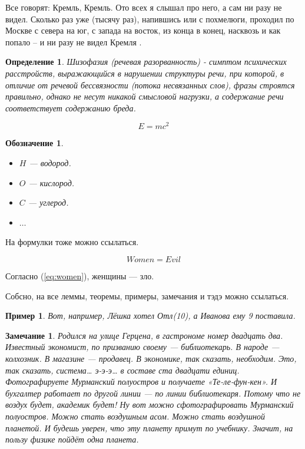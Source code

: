 \documentclass[14pt, a4paper, russian]{report}
\newtheorem{remark}{\indent Замечание}
\newtheorem{definition}{\indent Определение}
\newtheorem{example}{\indent Пример}
\newtheorem{notation}{\indent Обозначение}
\begin{document}
\begin{normalsize}
Все говорят: Кремль, Кремль. Ото всех я слышал про него, а сам ни разу не видел. Сколько раз уже (тысячу раз), напившись или с похмелюги, проходил по Москве с севера на юг, с запада на восток, из конца в конец, насквозь и как попало – и ни разу не видел Кремля \cite{erofeev}.

\begin{definition}\label{def:schizo}
Шизофазия (речевая разорванность) - симптом психических расстройств, выражающийся в нарушении структуры речи, при которой, в отличие от речевой бессвязности (потока несвязанных слов), фразы строятся правильно, однако не несут никакой смысловой нагрузки, а содержание речи соответствует содержанию бреда.\cite{schizo}
\end{definition}
$$E = m c^2$$

\begin{notation} 
\begin{itemize}
\item $H$ --- водород.
\item $O$ --- кислород.
\item $C$ --- углерод.
\item $\ldots$
\end{itemize}
\end{notation}

На формулки тоже можно ссылаться.

\begin{equation}\label{eq:women}
Women = Evil
\end{equation}

Согласно (\ref{eq:women}), женщины --- зло.

Собсно, на все леммы, теоремы, примеры, замечания и тэдэ можно ссылаться.

\begin{example}\label{ex:ivanova}
Вот, например, Лёшка хотел Отл(10), а Иванова ему 9 поставила.
\end{example}

\begin{remark}\label{rem:gertsen}
Родился на улице Герцена, в гастрономе номер двадцать два. Известный экономист, по призванию своему — библиотекарь. В народе — колхозник. В магазине — продавец. В экономике, так сказать, необходим. Это, так сказать, система… э-э-э… в составе ста двадцати единиц. Фотографируете Мурманский полуостров и получаете «Те-ле-фун-кен». И бухгалтер работает по другой линии — по линии библиотекаря. Потому что не воздух будет, академик будет! Ну вот можно сфотографировать Мурманский полуостров. Можно стать воздушным асом. Можно стать воздушной планетой. И будешь уверен, что эту планету примут по учебнику. Значит, на пользу физике пойдёт одна планета. \cite{schizo}
\end{remark}


\end{normalsize}
\end{document}
